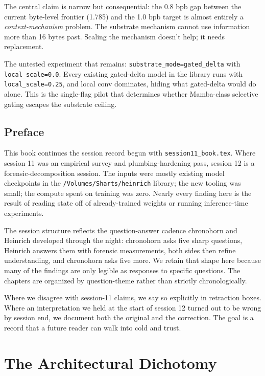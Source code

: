\documentclass[11pt,openany]{book}
\begin{document}
The central claim is narrow but consequential: the 0.8 bpb gap between the
current byte-level frontier (1.785) and the 1.0 bpb target is almost entirely
a \emph{context-mechanism} problem. The substrate mechanism cannot use
information more than 16 bytes past. Scaling the mechanism doesn't help; it
needs replacement.

The untested experiment that remains: \texttt{substrate\_mode=gated\_delta} with
\texttt{local\_scale=0.0}. Every existing gated-delta model in the library runs
with \texttt{local\_scale=0.25}, and local conv dominates, hiding what gated-delta
would do alone. This is the single-flag pilot that determines whether
Mamba-class selective gating escapes the substrate ceiling.

\tableofcontents

\chapter*{Preface}

This book continues the session record begun with \texttt{session11\_book.tex}.
Where session 11 was an empirical survey and plumbing-hardening pass, session
12 is a forensic-decomposition session. The inputs were mostly existing
model checkpoints in the \texttt{/Volumes/Sharts/heinrich} library; the new
tooling was small; the compute spent on training was zero. Nearly every
finding here is the result of reading state off of already-trained weights or
running inference-time experiments.

The session structure reflects the question-answer cadence chronohorn and
Heinrich developed through the night: chronohorn asks five sharp questions,
Heinrich answers them with forensic measurements, both sides then refine
understanding, and chronohorn asks five more. We retain that shape here
because many of the findings are only legible as responses to specific
questions. The chapters are organized by question-theme rather than
strictly chronologically.

Where we disagree with session-11 claims, we say so explicitly in
retraction boxes. Where an interpretation we held at the start of session 12
turned out to be wrong by session end, we document both the original and the
correction. The goal is a record that a future reader can walk into cold and
trust.

\mainmatter

\part{The Architectural Dichotomy}
\end{document}
